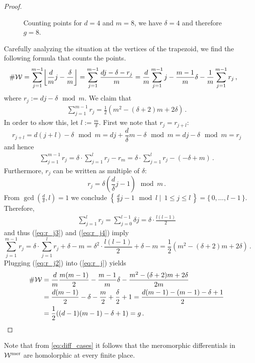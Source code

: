\documentclass[main.tex]{subfiles}
\begin{document}
\begin{proof}
\begin{figure}[H]
      \begin{center}
	  
      \end{center}
    \caption{Counting points for $d =4$ and $m = 8$, we have $\delta = 4$ and therefore $g = 8$.} 
    \label{fig:holom_diff}
\end{figure}
     Carefully analyzing the situation at the vertices of the trapezoid, we find the following formula that counts the points.
     \begin{align}\label{eq:r_j}
	\#\W & = \sum_{j = 1}^{m-1} \floor*{\frac{d}{m}j - \frac{\delta}{m}} = \sum_{j = 1}^{m-1} \frac{dj-\delta-r_j}{m} =
	 \frac{d}{m} \sum_{j=1}^{m-1} j - \frac{m-1}{m}\delta - \frac{1}{m} \sum_{j=1}^{m-1} r_j\,,
     \end{align}
      where $r_j := dj - \delta \, \bmod m$. \abstand
      We claim that
      \begin{align}\label{eq:r_j2}
       \sum_{j=1}^{m-1} r_j = \frac{1}{2}(m^2 - (\delta+2)m + 2\delta)\,.
      \end{align}
      In order to show this, let $l := \frac{m}{\delta}$. First we note that $r_j = r_{j+l}$:
      $$r_{j+l} = d(j+l) - \delta \, \bmod m = dj + \frac{d}{\delta}m - \delta \, \bmod m =  dj - \delta \, \bmod m =  r_j$$
      and hence 
      \begin{align}\label{eq:r_j3}
       \sum_{j=1}^{m-1} r_j = \delta \cdot \sum_{j=1}^{l} r_j - r_m = \delta \cdot \sum_{j=1}^{l} r_j - (-\delta + m)\,.
      \end{align}
      Furthermore, $r_j$ can be written as multiple of $\delta$:
      $$r_j = \delta \left(\frac{d}{\delta}j - 1\right) \, \bmod m\,.$$
      From $\gcd(\frac{d}{\delta},l) = 1$ we conclude $\left\{ \, \frac{d}{\delta}j - 1 \, \bmod l  \mid \, 1 \le j \le l \, \right\} = \{ \, 0,\dots,l-1 \, \}$.
      Therefore,  
      \begin{align}\label{eq:r_j4}
       \sum_{j = 1}^l r_j = \sum_{j = 0}^{l-1} \delta j = \delta \cdot \frac{l(l-1)}{2}
      \end{align}
      and thus (\ref{eq:r_j3}) and (\ref{eq:r_j4}) imply
      $$\sum_{j=1}^{m-1} r_j = \delta \cdot \sum_{j=1}^{l} r_j + \delta - m = \delta^2 \cdot \frac{l(l-1)}{2} + \delta - m = \frac{1}{2}(m^2 - (\delta+2)m + 2\delta)\,.$$
      Plugging (\ref{eq:r_j2}) into (\ref{eq:r_j}) yields
      \begin{align*}
	\#\mathcal{W} & = \frac{d}{m}\frac{m(m-1)}{2} - \frac{m-1}{m}\delta - \frac{m^2 - (\delta+2)m + 2\delta}{2m} \\
	       & = \frac{d(m-1)}{2} - \delta  - \frac{m}{2} + \frac{\delta}{2} + 1 =  \frac{d(m-1) - (m-1) - \delta + 1}{2} \\
	       & = \frac{1}{2}((d-1)(m-1)-\delta+1) = g\,.
      \end{align*}
     \end{proof}

     \begin{rmk}
      Note that from \eqref{eq:diff_cases} it follows that the meromorphic differentials in $\mathcal{W}^{\text{mer}}$ are homolorphic at every finite place. 
     \end{rmk}






\biblio 
\end{document}
